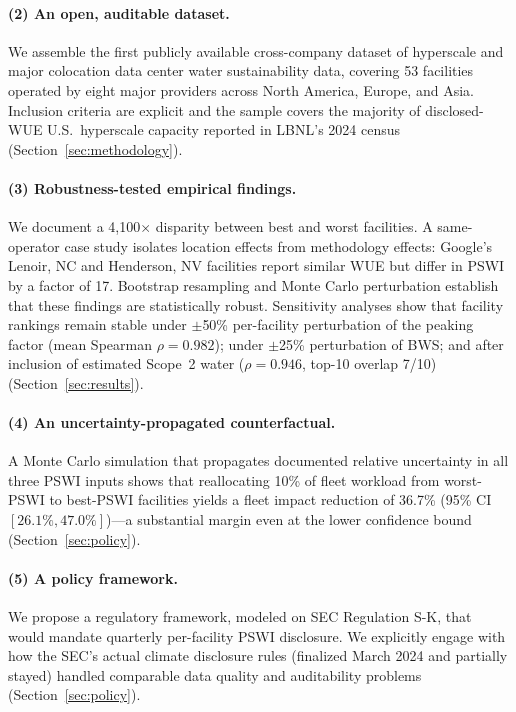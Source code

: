 \documentclass[conference,10pt]{IEEEtran}
\begin{document}
\paragraph{(2) An open, auditable dataset.}
We assemble the first publicly available cross-company dataset of
hyperscale and major colocation data center water sustainability data,
covering 53 facilities operated by eight major providers across North
America, Europe, and Asia. Inclusion criteria are explicit and the sample
covers the majority of disclosed-WUE U.S.\ hyperscale capacity reported
in LBNL's 2024 census~\cite{lbnl2024} (Section~\ref{sec:methodology}).

\paragraph{(3) Robustness-tested empirical findings.}
We document a 4{,}100$\times$ disparity between best and worst
facilities. A same-operator case study isolates location effects from
methodology effects: Google's Lenoir, NC and Henderson, NV facilities
report similar WUE but differ in PSWI by a factor of 17. Bootstrap
resampling and Monte Carlo perturbation establish that these findings
are statistically robust. Sensitivity analyses show that facility
rankings remain stable under $\pm$50\% per-facility perturbation of the
peaking factor (mean Spearman $\rho = 0.982$); under $\pm$25\%
perturbation of BWS; and after inclusion of estimated Scope~2 water
($\rho = 0.946$, top-10 overlap 7/10) (Section~\ref{sec:results}).

\paragraph{(4) An uncertainty-propagated counterfactual.}
A Monte Carlo simulation that propagates documented relative
uncertainty in all three PSWI inputs shows that reallocating 10\% of
fleet workload from worst-PSWI to best-PSWI facilities yields a fleet
impact reduction of 36.7\% (95\% CI $[26.1\%, 47.0\%]$)---a substantial
margin even at the lower confidence bound (Section~\ref{sec:policy}).

\paragraph{(5) A policy framework.}
We propose a regulatory framework, modeled on SEC Regulation S-K, that
would mandate quarterly per-facility PSWI disclosure. We explicitly
engage with how the SEC's actual climate disclosure rules
(finalized March 2024 and partially stayed) handled comparable data
quality and auditability problems (Section~\ref{sec:policy}).
\end{document}
